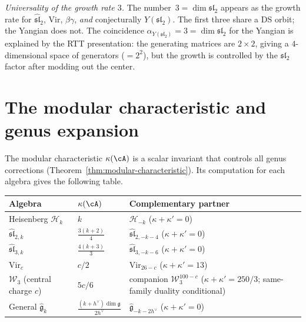 \emph{Universality of the growth rate $3$.}
The number~$3 = \dim\mathfrak{sl}_2$ appears as the growth rate for $\widehat{\mathfrak{sl}}_2$, $\mathrm{Vir}$, $\beta\gamma$, \emph{and} conjecturally $Y(\mathfrak{sl}_2)$. The first three share a DS orbit; the Yangian does not. The coincidence $\alpha_{Y(\mathfrak{sl}_2)} = 3 = \dim\mathfrak{sl}_2$ for the Yangian is explained by the RTT presentation: the generating matrices are $2 \times 2$, giving a $4$-dimensional space of generators ($= 2^2$), but the growth is controlled by the $\mathfrak{sl}_2$ factor after modding out the center.


\section{The modular characteristic and genus expansion}
\label{sec:modular-characteristic}

The modular characteristic $\kappa(\cA)$ is a scalar invariant that controls all genus corrections (Theorem~\ref{thm:modular-characteristic}). Its computation for each algebra gives the following table.

\begin{center}
\renewcommand{\arraystretch}{1.4}
\begin{tabular}{lll}
\toprule
\textbf{Algebra} & $\kappa(\cA)$ & \textbf{Complementary partner} \\
\midrule
Heisenberg $\mathcal{H}_k$ & $k$ & $\mathcal{H}_{-k}$ \quad ($\kappa + \kappa' = 0$) \\
$\widehat{\mathfrak{sl}}_{2,k}$ & $\frac{3(k+2)}{4}$ & $\widehat{\mathfrak{sl}}_{2,-k-4}$ \quad ($\kappa + \kappa' = 0$) \\
$\widehat{\mathfrak{sl}}_{3,k}$ & $\frac{4(k+3)}{3}$ & $\widehat{\mathfrak{sl}}_{3,-k-6}$ \quad ($\kappa + \kappa' = 0$) \\
$\mathrm{Vir}_c$ & $c/2$ & $\mathrm{Vir}_{26-c}$ \quad ($\kappa + \kappa' = 13$) \\
$\mathcal{W}_3$ (central charge $c$) & $5c/6$ & companion $\mathcal{W}_3^{100-c}$ \quad ($\kappa + \kappa' = 250/3$; same-family duality conditional) \\
General $\widehat{\mathfrak{g}}_k$ & $\frac{(k+h^\vee)\dim\mathfrak{g}}{2h^\vee}$ & $\widehat{\mathfrak{g}}_{-k-2h^\vee}$ \quad ($\kappa + \kappa' = 0$) \\
\bottomrule
\end{tabular}
\end{center}

